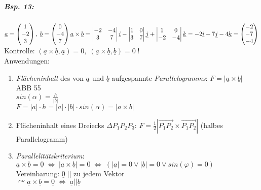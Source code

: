 \subparagraph{Bsp. 13:}\parskp
$\underline{a}=\begin{pmatrix}
1\\
-2\\
3
\end{pmatrix}, \; \underline{b}= \begin{pmatrix}
0\\
-4\\
7
\end{pmatrix}\\
\underline{a}\times \underline{b} = \begin{vmatrix}
-2 & -4\\
3 & 7
\end{vmatrix}\underline{i}- \begin{vmatrix}
1 & 0 \\
3 & 7
\end{vmatrix} \underline{j}+ \begin{vmatrix}
1 & 0\\
-2 & -4
\end{vmatrix} \underline{k}= -2 \underline{i} -7 \underline{j} - 4 \underline{k}= \begin{pmatrix}
-2\\
-7\\
-4
\end{pmatrix}$\\
Kontrolle: $(\underline{a} \times \underline{b}, \underline{a})=0, \; (\underline{a} \times \underline{b}, \underline{b})=0 \; !$\bigskip\\
Anwendungen:
\begin{enumerate}
\item \emph{Flächeninhalt} des von $\underline{a}$ und $\underline{b}$ aufgespannte \emph{Parallelogramms}: $\boxed{F=|\underline{a} \times \underline{b}|}$\\
ABB 55\\
$sin(\alpha)=\frac{h}{|\underline{b}|}$\\
$F=|\underline{a}|\cdot h = |\underline{a}| \cdot |\underline{b}| \cdot sin(\alpha)=|\underline{a} \times \underline{b}|$
\item Flächeninhalt eines Dreiecks $\Delta P_1P_2P_3$: $\boxed{F= \frac{1}{2}\left|\overrightarrow{P_1P_2}\times \overrightarrow{P_1P_2}\right|}$ (halbes Parallelogramm)
\item \emph{Parallelitätskriterium}: $\underline{a}\times \underline{b}=\underline{0} \; \Leftrightarrow \; |\underline{a} \times \underline{b}|=0 \; \Leftrightarrow \; (|\underline{a}| =0 \vee |\underline{b}|=0 \vee sin(\varphi)=0)$\\
Vereinbarung: $\underline{0}\; ||$ zu jedem Vektor\\
$\curvearrowright \boxed{\underline{a}\times \underline{b}=\underline{0} \; \Leftrightarrow \; \underline{a} || \underline{b}}$
\end{enumerate}


